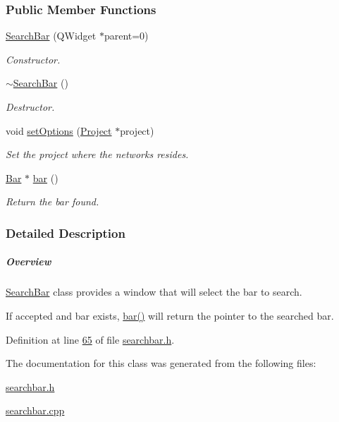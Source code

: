 \subsubsection*{Public Member Functions}
\begin{DoxyCompactItemize}
\item 
\hyperlink{group___window_ga75f8caf009094148f56149b00996ac84}{Search\+Bar} (Q\+Widget $\ast$parent=0)
\begin{DoxyCompactList}\small\item\em Constructor. \end{DoxyCompactList}\item 
\hyperlink{group___window_ga553f2c7b9c15e7ae39cf988a6ef8f786}{$\sim$\+Search\+Bar} ()
\begin{DoxyCompactList}\small\item\em Destructor. \end{DoxyCompactList}\item 
void \hyperlink{group___window_ga840eb8fbdea559d31a7c2af6a4cbc480}{set\+Options} (\hyperlink{class_project}{Project} $\ast$project)
\begin{DoxyCompactList}\small\item\em Set the project where the networks resides. \end{DoxyCompactList}\item 
\hyperlink{class_bar}{Bar} $\ast$ \hyperlink{group___window_ga25ce5aca2c8db4e81e5357c9a4c01b56}{bar} ()
\begin{DoxyCompactList}\small\item\em Return the bar found. \end{DoxyCompactList}\end{DoxyCompactItemize}


\subsubsection{Detailed Description}
\subparagraph*{Overview}

\hyperlink{class_search_bar}{Search\+Bar} class provides a window that will select the bar to search.

If accepted and bar exists, \hyperlink{group___window_ga25ce5aca2c8db4e81e5357c9a4c01b56}{bar()} will return the pointer to the searched bar. 

Definition at line \hyperlink{searchbar_8h_source_l00065}{65} of file \hyperlink{searchbar_8h_source}{searchbar.\+h}.



The documentation for this class was generated from the following files\+:\begin{DoxyCompactItemize}
\item 
\hyperlink{searchbar_8h}{searchbar.\+h}\item 
\hyperlink{searchbar_8cpp}{searchbar.\+cpp}\end{DoxyCompactItemize}
